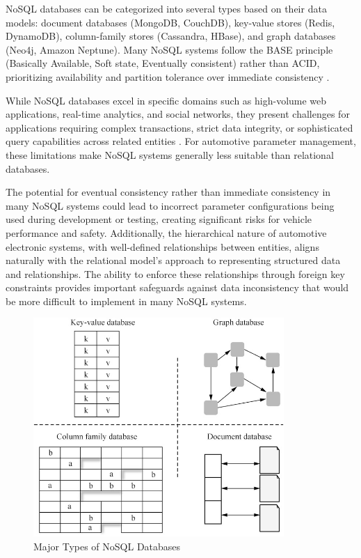 NoSQL databases can be categorized into several types based on their data models: document databases (MongoDB, CouchDB), key-value stores (Redis, DynamoDB), column-family stores (Cassandra, HBase), and graph databases (Neo4j, Amazon Neptune). Many NoSQL systems follow the BASE principle (Basically Available, Soft state, Eventually consistent) rather than ACID, prioritizing availability and partition tolerance over immediate consistency \cite{brewer2000towards}.

While NoSQL databases excel in specific domains such as high-volume web applications, real-time analytics, and social networks, they present challenges for applications requiring complex transactions, strict data integrity, or sophisticated query capabilities across related entities \cite{kleppmann2017conflict}. For automotive parameter management, these limitations make NoSQL systems generally less suitable than relational databases.

The potential for eventual consistency rather than immediate consistency in many NoSQL systems could lead to incorrect parameter configurations being used during development or testing, creating significant risks for vehicle performance and safety. Additionally, the hierarchical nature of automotive electronic systems, with well-defined relationships between entities, aligns naturally with the relational model's approach to representing structured data and relationships. The ability to enforce these relationships through foreign key constraints provides important safeguards against data inconsistency that would be more difficult to implement in many NoSQL systems.

\begin{figure}[ht]
    \centering
    \includegraphics[width=0.85\textwidth]{figures/nosql_types.png}
    \caption{Major Types of NoSQL Databases \cite{gaussdbdatabase}}
    \label{fig:nosql-types}
\end{figure}


